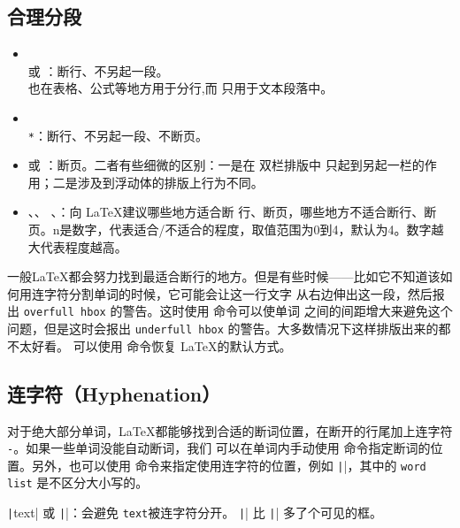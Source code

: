 \documentclass[UTF8]{ctexart}
\begin{document}
\subsection{合理分段}
\begin{itemize}
    \item \texttt{\\} 或 \texttt{\newline}：断行、不另起一段。
    \texttt{\\} 也在表格、公式等地方用于分行,而 \texttt{\newline} 只用于文本段落中。
    \item \texttt{\\*}：断行、不另起一段、不断页。
    \item \texttt{\newpage} 或 \texttt{\clearpage}：断页。二者有些细微的区别：一是在
    双栏排版中 \texttt{\newpage} 只起到另起一栏的作用；二是涉及到浮动体的排版上行为不同。
    \item \texttt{\linebreak[n]}、\texttt{\nolinebreak[n]}、
    \texttt{\pagebreak[n]}、\texttt{\nopagebreak[n]}：向 \LaTeX 建议哪些地方适合断
    行、断页，哪些地方不适合断行、断页。n是数字，代表适合/不适合的程度，取值范围为0到4，默认为4。数字越大代表程度越高。
\end{itemize}

一般\LaTeX 都会努力找到最适合断行的地方。但是有些时候——比如它不知道该如何用连字符分割单词的时候，它可能会让这一行文字
从右边伸出这一段，然后报出 \texttt{overfull hbox} 的警告。这时使用 \texttt{\sloppy} 命令可以使单词
之间的间距增大来避免这个问题，但是这时会报出 \texttt{underfull hbox} 的警告。大多数情况下这样排版出来的都不太好看。
可以使用 \texttt{\fussy} 命令恢复 \LaTeX 的默认方式。

\subsection{连字符（Hyphenation）}
对于绝大部分单词，\LaTeX 都能够找到合适的断词位置，在断开的行尾加上连字符 \texttt{-}。如果一些单词没能自动断词，我们
可以在单词内手动使用 \texttt{\-} 命令指定断词的位置。另外，也可以使用
\texttt{} 命令来指定使用连字符的位置，例如
\texttt||，其中的 \texttt{word list} 是不区分大小写的。

\texttt|\mbox{text}| 或 \texttt||：会避免 \texttt{text}被连字符分开。
\texttt|\fbox| 比 \texttt|\mbox| 多了个可见的框。
\end{document}
